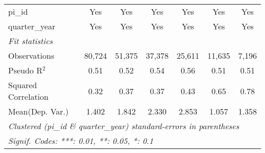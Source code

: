 \begin{tabular}{lcccccc}
   pi\_id                                                     & Yes            & Yes          & Yes          & Yes            & Yes           & Yes\\  
   quarter\_year                                              & Yes            & Yes          & Yes          & Yes            & Yes           & Yes\\  
   \midrule
   \emph{Fit statistics}\\
   Observations                                               & 80,724         & 51,375       & 37,378       & 25,611         & 11,635        & 7,196\\  
   Pseudo R$^2$                                               & 0.51           & 0.52         & 0.54         & 0.56           & 0.51          & 0.51\\  
   Squared Correlation                                        & 0.32           & 0.37         & 0.37         & 0.43           & 0.65          & 0.78\\  
Mean(Dep. Var.) & 1.402 & 1.842 & 2.330 & 2.853 & 1.057 & 1.358 \\
   \midrule \midrule
   \multicolumn{7}{l}{\emph{Clustered (pi\_id \& quarter\_year) standard-errors in parentheses}}\\
   \multicolumn{7}{l}{\emph{Signif. Codes: ***: 0.01, **: 0.05, *: 0.1}}\\
\end{tabular}
\par\endgroup
